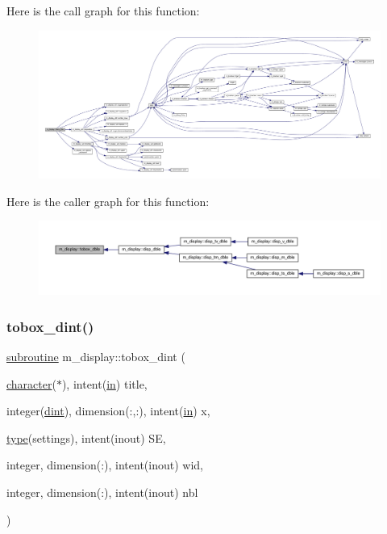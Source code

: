 Here is the call graph for this function\+:
\nopagebreak
\begin{figure}[H]
\begin{center}
\leavevmode
\includegraphics[width=350pt]{namespacem__display_abcff2aedbfe00eb52827b4941af59831_cgraph}
\end{center}
\end{figure}
Here is the caller graph for this function\+:
\nopagebreak
\begin{figure}[H]
\begin{center}
\leavevmode
\includegraphics[width=350pt]{namespacem__display_abcff2aedbfe00eb52827b4941af59831_icgraph}
\end{center}
\end{figure}
\mbox{\label{namespacem__display_a305dbf4f9072f9d1551a24c0f26ad508}} 
\subsubsection{\texorpdfstring{tobox\+\_\+dint()}{tobox\_dint()}}
{\footnotesize\ttfamily \hyperlink{M__stopwatch_83_8txt_acfbcff50169d691ff02d4a123ed70482}{subroutine} m\+\_\+display\+::tobox\+\_\+dint (\begin{DoxyParamCaption}\item[{\hyperlink{option__stopwatch_83_8txt_abd4b21fbbd175834027b5224bfe97e66}{character}($\ast$), intent(\hyperlink{M__journal_83_8txt_afce72651d1eed785a2132bee863b2f38}{in})}]{title,  }\item[{integer(\hyperlink{namespacem__display_a73f772e9702cad6f40b78364fde2c7cd}{dint}), dimension(\+:,\+:), intent(\hyperlink{M__journal_83_8txt_afce72651d1eed785a2132bee863b2f38}{in})}]{x,  }\item[{\hyperlink{stop__watch_83_8txt_a70f0ead91c32e25323c03265aa302c1c}{type}(settings), intent(inout)}]{SE,  }\item[{integer, dimension(\+:), intent(inout)}]{wid,  }\item[{integer, dimension(\+:), intent(inout)}]{nbl }\end{DoxyParamCaption})\hspace{0.3cm}{\ttfamily [private]}}



